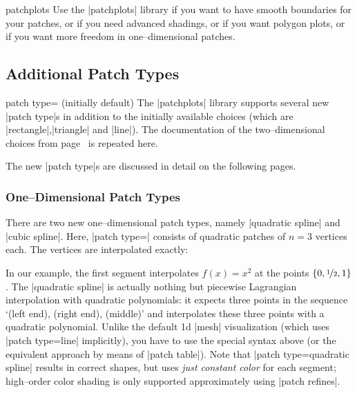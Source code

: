 {\begin{pgfplotslibrary}{patchplots}
	Use the |patchplots| library if you want to have smooth boundaries for your patches, or if you need advanced shadings, or if you want polygon plots, or if you want more freedom in one--dimensional patches. 

\subsection{Additional Patch Types}
%
\begin{pgfplotskey}{patch type= (initially default)}
	The |patchplots| library supports several new |patch type|s in addition to the initially available choices (which are |rectangle|,|triangle| and |line|). The documentation of the two--dimensional choices from page~\pageref{key:patch:type} is repeated here.

	The new |patch type|s are discussed in detail on the following pages.
\end{pgfplotskey} %

\subsubsection{One--Dimensional Patch Types}
	There are two new one--dimensional patch types, namely |quadratic spline| and |cubic spline|. Here, |patch type=| consists of quadratic patches of $n=3$ vertices each. The vertices are interpolated exactly:
\begin{codeexample}[]
\end{codeexample}
	\noindent In our example, the first segment interpolates $f(x)=x^2$ at the points $\{0,\nicefrac12,1\}$. The |quadratic spline| is actually nothing but piecewise Lagrangian interpolation with quadratic polynomials: it expects three points in the sequence `(left end), (right end), (middle)' and interpolates these three points with a quadratic polynomial. Unlike the default 1d |mesh| visualization (which uses |patch type=line| implicitly), you have to use the special syntax above (or the equivalent approach by means of |patch table|). Note that |patch type=quadratic spline| results in correct shapes, but uses \emph{just constant color} for each segment; high--order color shading is only supported approximately using |patch refines|.


\end{pgfplotslibrary}}
